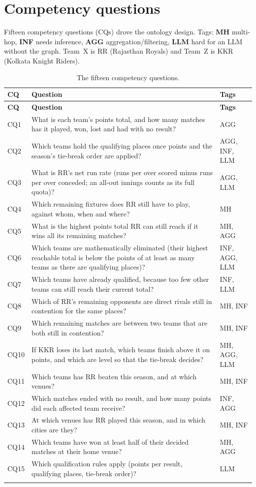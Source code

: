 \section{Competency questions}
Fifteen competency questions (CQs) drove the ontology design. Tags: \textbf{MH} multi-hop, \textbf{INF} needs
inference, \textbf{AGG} aggregation/filtering, \textbf{LLM} hard for an LLM without the graph. Team~X is RR
(Rajasthan Royals) and Team~Z is KKR (Kolkata Knight Riders).

{\small
\begin{longtable}{p{1.0cm}p{12.1cm}p{2.0cm}}
\toprule \textbf{CQ} & \textbf{Question} & \textbf{Tags} \\ \midrule \endfirsthead
\toprule \textbf{CQ} & \textbf{Question} & \textbf{Tags} \\ \midrule \endhead
CQ1 & What is each team's points total, and how many matches has it played, won, lost and had with no result? & AGG \\
CQ2 & Which teams hold the qualifying places once points and the season's tie-break order are applied? & AGG, INF, LLM \\
CQ3 & What is RR's net run rate (runs per over scored minus runs per over conceded; an all-out innings counts as its full quota)? & AGG, LLM \\
CQ4 & Which remaining fixtures does RR still have to play, against whom, when and where? & MH \\
CQ5 & What is the highest points total RR can still reach if it wins all its remaining matches? & MH, AGG \\
CQ6 & Which teams are mathematically eliminated (their highest reachable total is below the points of at least as many teams as there are qualifying places)? & INF, AGG, LLM \\
CQ7 & Which teams have already qualified, because too few other teams can still reach their current total? & INF, LLM \\
CQ8 & Which of RR's remaining opponents are direct rivals still in contention for the same places? & MH, INF \\
CQ9 & Which remaining matches are between two teams that are both still in contention? & MH, INF \\
CQ10 & If KKR loses its last match, which teams finish above it on points, and which are level so that the tie-break decides? & MH, AGG, LLM \\
CQ11 & Which teams has RR beaten this season, and at which venues? & MH, INF \\
CQ12 & Which matches ended with no result, and how many points did each affected team receive? & INF, AGG \\
CQ13 & At which venues has RR played this season, and in which cities are they? & MH, INF \\
CQ14 & Which teams have won at least half of their decided matches at their home venue? & MH, AGG \\
CQ15 & Which qualification rules apply (points per result, qualifying places, tie-break order)? & LLM \\
\bottomrule
\caption{The fifteen competency questions.}\label{tab:cqs}
\end{longtable}}

